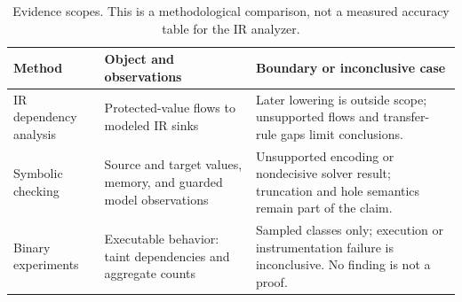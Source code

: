 \begin{table}[H]
\caption{Evidence scopes. This is a methodological comparison, not a measured accuracy
table for the IR analyzer.}
\label{tab:analysis-boundaries}
\centering
\footnotesize
\setlength{\tabcolsep}{3pt}
\renewcommand{\arraystretch}{1.15}
\begin{tabular}{@{}>{\raggedright\arraybackslash}p{}
                  >{\raggedright\arraybackslash}p{}
                  >{\raggedright\arraybackslash}p{}@{}}
\hline
Method & Object and observations & Boundary or inconclusive case \\
\hline
IR dependency analysis & Protected-value flows to modeled IR sinks
  & Later lowering is outside scope; unsupported flows and transfer-rule gaps limit
    conclusions. \\
Symbolic checking & Source and target values, memory, and guarded model observations
  & Unsupported encoding or nondecisive solver result; truncation and hole semantics
    remain part of the claim. \\
Binary experiments & Executable behavior: taint dependencies and aggregate counts
  & Sampled classes only; execution or instrumentation failure is inconclusive. No
    finding is not a proof. \\
\hline
\end{tabular}
\end{table}